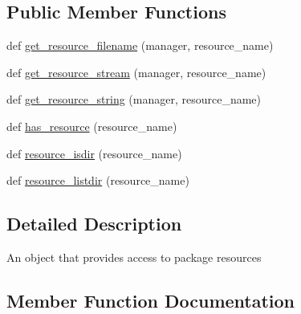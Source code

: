 \subsection*{Public Member Functions}
\begin{DoxyCompactItemize}
\item 
def \hyperlink{classpip_1_1__vendor_1_1pkg__resources_1_1IResourceProvider_a49d340509e7f7dc896d70da9527abcc1}{get\+\_\+resource\+\_\+filename} (manager, resource\+\_\+name)
\item 
def \hyperlink{classpip_1_1__vendor_1_1pkg__resources_1_1IResourceProvider_a78cd757f955caeb60af6ae3ea77173b1}{get\+\_\+resource\+\_\+stream} (manager, resource\+\_\+name)
\item 
def \hyperlink{classpip_1_1__vendor_1_1pkg__resources_1_1IResourceProvider_aeea78bc89c378b5f2938a6c33e9e6d65}{get\+\_\+resource\+\_\+string} (manager, resource\+\_\+name)
\item 
def \hyperlink{classpip_1_1__vendor_1_1pkg__resources_1_1IResourceProvider_af7047c54b3e314b3ed991a7acd2a8f21}{has\+\_\+resource} (resource\+\_\+name)
\item 
def \hyperlink{classpip_1_1__vendor_1_1pkg__resources_1_1IResourceProvider_a7e4658f0a1299c166aef3220cb3e3d2d}{resource\+\_\+isdir} (resource\+\_\+name)
\item 
def \hyperlink{classpip_1_1__vendor_1_1pkg__resources_1_1IResourceProvider_a063a75ac43a3f311eddae86f2a69c323}{resource\+\_\+listdir} (resource\+\_\+name)
\end{DoxyCompactItemize}


\subsection{Detailed Description}
\begin{DoxyVerb}An object that provides access to package resources\end{DoxyVerb}
 

\subsection{Member Function Documentation}
\mbox{\label{classpip_1_1__vendor_1_1pkg__resources_1_1IResourceProvider_a49d340509e7f7dc896d70da9527abcc1}} 
